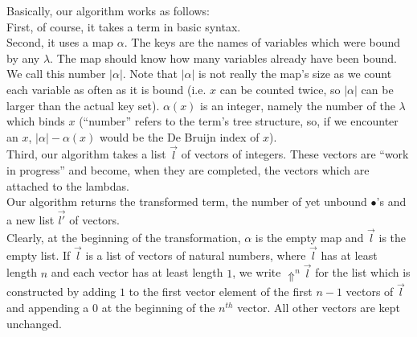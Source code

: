 \documentclass[12pt, a4paper, titlepage]{article}
\newcommand{\ovar}{\mathord{\bullet}}
\newcommand{\la}{\lambda}
\newcommand{\upch}[1]{\Uparrow^{#1}}
\begin{document}
Basically, our algorithm works as follows: \\
First, of course, it takes a term in basic syntax. \\
Second, it uses a map $\alpha$. 
The keys are the names of variables which were bound by any $\la$. The map should know how many variables already have been bound. We call this number $|\alpha|$. Note that $|\alpha|$ is not really the map's size as we count each variable as often as it is bound (i.e. $x$ can be counted twice, so $|\alpha|$ can be larger than the actual key set). $\alpha(x)$ is an integer, namely the number of the $\la$ which binds $x$ (``number'' refers to the term's tree structure, so, if we encounter an $x$, $|\alpha| - \alpha(x)$ would be the De Bruijn index of $x$). \\
Third, our algorithm takes a list $\vec l$ of vectors of integers. These vectors are ``work in progress'' and become, when they are completed, the vectors which are attached to the lambdas. \\
Our algorithm returns the transformed term, the number of yet unbound $\ovar$'s and a new list $\vec {l'}$ of vectors.\\
Clearly, at the beginning of the transformation, $\alpha$ is the empty map and $\vec l$ is the empty list. 
If $\vec l$ is a list of vectors of natural numbers, where $\vec l$ has at least length $n$ and each vector has at least length $1$, we write $\upch n {\vec l}$ 
for the list which is constructed by adding $1$ to the first vector element of the first $n-1$ vectors of $\vec l$ and appending a $0$ at the beginning of the $n^{th}$ vector. All other vectors are kept unchanged.
\end{document}
